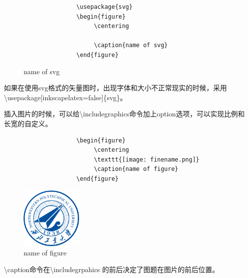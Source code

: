 \documentclass[12pt]{book}
\begin{document}
\begin{figure}[htbp]
     \begin{minipage}{0.45\textwidth}
          \begin{verbatim}
               \usepackage{svg}
               \begin{figure}
                    \centering
                    
                    \caption{name of svg}
               \end{figure}
          \end{verbatim}
     \end{minipage}
     \begin{minipage}{0.45\textwidth}
          \centering
          
          \caption{name of svg}
     \end{minipage}
\end{figure}
如果在使用svg格式的矢量图时，出现字体和大小不正常现实的时候，采用\textbackslash usepackage[inkscapelatex=false]\{svg\}。

插入图片的时候，可以给\textbackslash includegraphics命令加上option选项，可以实现比例和长宽的自定义。
\begin{figure}[htbp]
     \begin{minipage}{0.45\textwidth}
          \begin{verbatim}
               \begin{figure}
                    \centering
                    \texttt{[image: finename.png]}
                    \caption{name of figure}
               \end{figure}
          \end{verbatim}
     \end{minipage}
     \begin{minipage}{0.45\textwidth}
          \centering
          \includegraphics[width=3cm]{logo.png}
          \caption{name of figure}
     \end{minipage}
\end{figure}

\textbackslash caption命令在\textbackslash includegrpahics 的前后决定了图题在图片的前后位置。
\end{document}
